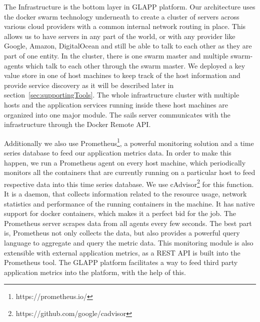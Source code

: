 \documentclass{seal_thesis}
\begin{document}
The Infrastructure is the bottom layer in GLAPP platform. 
Our architecture uses the docker swarm technology underneath to create a cluster of servers across various cloud providers with a common internal network routing in place. 
This allows us to have servers in any part of the world, or with any provider like Google, Amazon, DigitalOcean and still be able to talk to each other as they are part of one entity. 
In the cluster, there is one swarm master and multiple swarm-agents which talk to each other through the swarm master. 
We deployed a key value store in one of host machines to keep track of the host information and provide service discovery as it will be described later in section~\ref{sec:supportingTools}.
The whole infrastructure cluster with multiple hosts and the application services running inside these host machines are organized into one major module. 
The sails server communicates with the infrastructure through the Docker Remote API. 

Additionally we also use Prometheus\footnote{https://prometheus.io/}, a powerful monitoring solution and a time series database to feed our application metrics data. 
In order to make this happen, we run a Prometheus agent on every host machine, which periodically monitors all the containers that are currently running on a particular host to feed respective data into this time series database. 
We use cAdvisor\footnote{https://github.com/google/cadvisor} for this function. 
It is a daemon, that collects information related to the resource usage, network statistics and performance of the running containers in the machine. 
It has native support for docker containers, which makes it a perfect bid for the job. 
The Prometheus server scrapes data from all agents every few seconds. 
The best part is, Prometheus not only collects the data, but also provides a powerful query language to aggregate and query the metric data. 
This monitoring module is also extensible with external application metrics, as a REST API is built into the Prometheus tool. 
The GLAPP platform facilitates a way to feed third party application metrics into the platform, with the help of this.
\end{document}
